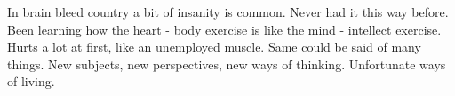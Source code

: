 

In brain bleed country a bit of insanity is common.  Never had it this
way before.  Been learning how the heart - body exercise is like the
mind - intellect exercise.  Hurts a lot at first, like an unemployed
muscle.  Same could be said of many things.  New subjects, new
perspectives, new ways of thinking.  Unfortunate ways of living.

\bye
